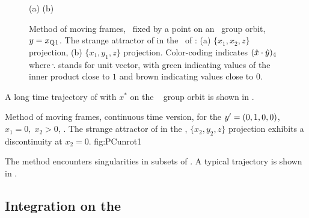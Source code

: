 {%
\begin{figure}[ht]
\begin{center}
(a) %
(b) %
\end{center}
\caption{
Method of moving frames, \slice\ fixed by a point on an
\reqv\ group orbit, $y = x_{\mathrm{Q}_{}1}$. The strange
attractor of  in the \reducedsp\
of :
(a) $\{x_1,x_2,z\}$ projection,
(b) $\{x_1,y_1,z\}$ projection.
Color-coding indicates $(\hat{x} \cdot \hat{y})_4$
where $\hat{.}$ stands for unit vector, with green indicating values
of the inner product close to $1$ and brown indicating values
close to $0$.
    }
\label{fig:CLEpcSect}
\end{figure}
%
A long time trajectory of  with
$x^*$ on the \reqv\  group orbit is shown in
.


{}{
Method of moving frames, continuous time version, for the
${y'}=(0,1,0,0)$,
$x_1=0,\;x_2>0$, \slice. The strange attractor of
 in the \reducedsp,
$\{x_2,y_2,z\}$ projection exhibits a discontinuity at
$x_2=0$.
}
{fig:PCunrot1}

The method encounters singularities in
subsets of \statesp{}.
A typical trajectory is shown in \reffig{fig:PCunrot1}.

\subsection{Integration on the \slice}

}
